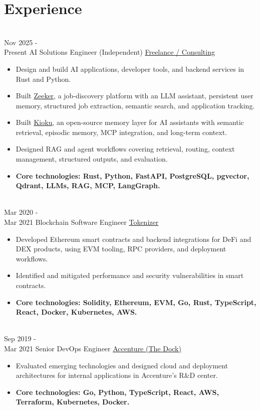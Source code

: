 \documentclass[letterpaper]{twentysecondcv} %
\begin{document}
\makeprofilePart
\enlargethispage{3\baselineskip}
\section{Experience}
\begin{twenty}

\twentyitem
    {\\
    Nov 2025 - \\ Present}
    {AI Solutions Engineer (Independent)}
    {\href{https://zeeker.business/}{Freelance / Consulting}}
    {}
    {
    \begin{itemize}
    \item Design and build AI applications, developer tools, and backend services in Rust and Python.
    \item Built \href{https://zeeker.business/}{Zeeker}, a job-discovery platform with an LLM assistant, persistent user memory, structured job extraction, semantic search, and application tracking.
    \item Built \href{https://github.com/felipemeriga/kioku}{Kioku}, an open-source memory layer for AI assistants with semantic retrieval, episodic memory, MCP integration, and long-term context.
    \item Designed RAG and agent workflows covering retrieval, routing, context management, structured outputs, and evaluation.
    \item \textbf{Core technologies: Rust, Python, FastAPI, PostgreSQL, pgvector, Qdrant, LLMs, RAG, MCP, LangGraph.}
    \end{itemize}
    }

\twentyitem
    {\\
    Mar 2020 - \\ Mar 2021}
    {Blockchain Software Engineer}
    {\href{https://tokenizer.cc}{Tokenizer}}
    {}
    {
    \begin{itemize}
    \item Developed Ethereum smart contracts and backend integrations for DeFi and DEX products, using EVM tooling, RPC providers, and deployment workflows.
    \item Identified and mitigated performance and security vulnerabilities in smart contracts.
    \item \textbf{Core technologies: Solidity, Ethereum, EVM, Go, Rust, TypeScript, React, Docker, Kubernetes, AWS.}
    \end{itemize}
    }

\twentyitem
    {\\
    Sep 2019 - \\ Mar 2021}
    {Senior DevOps Engineer}
    {\href{https://www.accenture.com/ie-en}{Accenture (The Dock)}}
    {}
    {
    \begin{itemize}
    \item Evaluated emerging technologies and designed cloud and deployment architectures for internal applications in Accenture's R\&D center.
    \item \textbf{Core technologies: Go, Python, TypeScript, React, AWS, Terraform, Kubernetes, Docker.}
    \end{itemize}
    }

\end{twenty}
\end{document}
